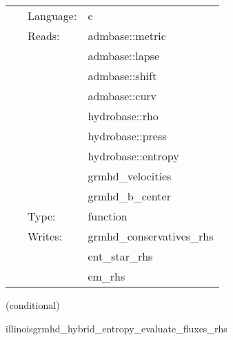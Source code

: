  \begin{tabular*}{160mm}{cll} 
~ & Language:  & c \\ 
~ & Reads:  & admbase::metric \\ 
~& ~ &admbase::lapse\\ 
~& ~ &admbase::shift\\ 
~& ~ &admbase::curv\\ 
~& ~ &hydrobase::rho\\ 
~& ~ &hydrobase::press\\ 
~& ~ &hydrobase::entropy\\ 
~& ~ &grmhd\_velocities\\ 
~& ~ &grmhd\_b\_center\\ 
~ & Type:  & function \\ 
~ & Writes:  & grmhd\_conservatives\_rhs \\ 
~& ~ &ent\_star\_rhs\\ 
~& ~ &em\_rhs\\ 
\end{tabular*} 


\vspace{5mm}

   (conditional) 

\hspace{5mm} illinoisgrmhd\_hybrid\_entropy\_evaluate\_fluxes\_rhs 

\hspace{5mm}{\it entropy+hybrid version of illinoisgrmhd\_evaluate\_fluxes\_rhs } 


\hspace{5mm}

